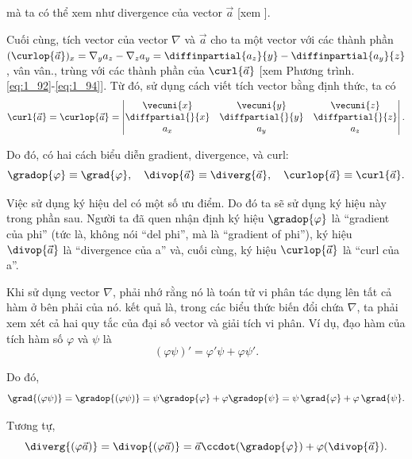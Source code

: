 \noindent
mà ta có thể xem như divergence của vector $\vec{a}$ [xem ].

Cuối cùng, tích vector của vector $\nabla$ và $\vec{a}$ cho ta một vector với các thành phần $(\curlop{\vec{a}})_x=\nabla_{y}a_{z} - \nabla_{z}a_{y}=\diffinpartial{a_z}{y}-\diffinpartial{a_y}{z}$, vân vân., trùng với các thành phần của $\curl{\vec{a}}$ [xem Phương trình. \eqref{eq:1_92}-\eqref{eq:1_94}]. Từ đó, sử dụng cách viết tích vector bằng định thức, ta có
\begin{equation}\label{1_101}
	\curl{\vec{a}} = \curlop{\vec{a}} = \begin{vmatrix}
	\vecuni{x} & \vecuni{y} & \vecuni{z}\\
	\diffpartial{}{x} & \diffpartial{}{y} & \diffpartial{}{z}\\
	a_x & a_y & a_z
	\end{vmatrix}.
\end{equation}

Do đó, có hai cách biểu diễn gradient, divergence, và curl:
\begin{equation*}
	\gradop{\varphi}\equiv\grad{\varphi},\quad \divop{\vec{a}}\equiv\diverg{\vec{a}},\quad \curlop{\vec{a}}\equiv\curl{\vec{a}}.
\end{equation*}

\noindent
Việc sử dụng ký hiệu del có một số ưu điểm. Do đó ta sẽ sử dụng ký hiệu này trong phần sau. Người ta đã quen nhận định ký hiệu $\gradop{\varphi}$ là ``gradient của phi'' (tức là, không nói ``del phi'', mà là ``gradient of phi''), ký hiệu $\divop{\vec{a}}$ là ``divergence của a'' và, cuối cùng, ký hiệu $\curlop{\vec{a}}$ là ``curl của a''.

Khi sử dụng vector $\nabla$, phải nhớ rằng nó là toán tử vi phân tác dụng lên tất cả hàm ở bên phải của nó. kết quả là, trong các biểu thức biến đổi chứa $\nabla$, ta phải xem xét cả hai quy tắc của đại số vector và giải tích vi phân. Ví dụ, đạo hàm của tích hàm số $\varphi$ và $\psi$ là
\begin{equation*}
	(\varphi\psi)' = \varphi'\psi + \varphi\psi'.
\end{equation*}

\noindent
Do đó,
\begin{equation}\label{eq:1_102}
	\grad{(\varphi\psi)} = \gradop{(\varphi\psi)} = \psi\gradop{\varphi} + \varphi\gradop{\psi} = \psi\,\grad{\varphi} + \varphi\,\grad{\psi}.
\end{equation}

\noindent
Tương tự,
\begin{equation}\label{eq:1_103}
	\diverg{(\varphi\vec{a})} = \divop{(\varphi\vec{a})} = \vec{a}\ccdot(\gradop{\varphi}) + \varphi(\divop{\vec{a}}).
\end{equation}

